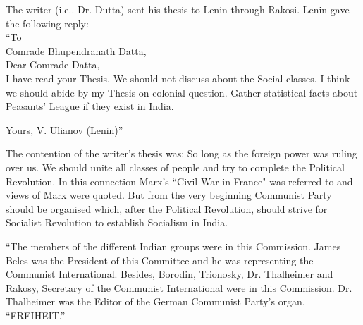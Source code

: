 The writer (i.e.. Dr. Dutta) sent his thesis to Lenin through Rakosi. Lenin gave the following reply: \\


\indent“To \\
\indent Comrade Bhupendranath Datta, \\
\indent Dear Comrade Datta, \\
\indent I have read your Thesis. We should not discuss about the Social 
classes. I think we should abide by my Thesis on colonial 
question. Gather statistical facts about Peasants’ League if they 
exist in India. 

\begin{flushright}
Yours, 
V. Ulianov (Lenin)” 
\end{flushright}

The contention of the writer’s thesis was: So long as the foreign power was ruling over us. We should unite all classes of people and try to complete the Political Revolution. In this connection Marx’s “Civil War in France" was referred to and views of Marx were quoted. But from the very beginning Communist Party should be organised which, after the Political Revolution, should strive for Socialist Revolution to establish Socialism in India. 

“The members of the different Indian groups were in this Commission. James Beles was the President of this Committee and he was representing the Communist International. Besides, Borodin, Trionosky, Dr. Thalheimer and Rakosy, Secretary of the Communist International were in this Commission. Dr. Thalheimer was the Editor of the German Communist Party’s organ, “FREIHEIT.” 

